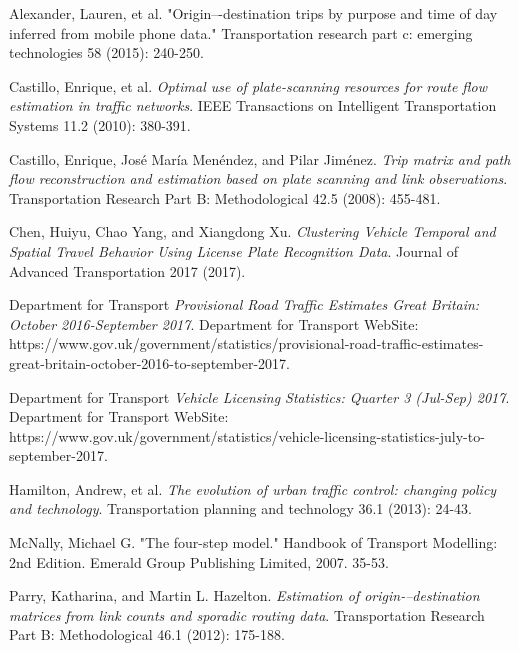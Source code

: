 \documentclass[twoside,leqno,twocolumn]{article}
\begin{document}










\begin{thebibliography}{99}

Alexander, Lauren, et al. "Origin–-destination trips by purpose and time of day inferred from mobile phone data." Transportation research part c: emerging technologies 58 (2015): 240-250.

Castillo, Enrique, et al. {\em Optimal use of plate-scanning resources for route flow estimation in traffic networks}. IEEE Transactions on Intelligent Transportation Systems 11.2 (2010): 380-391.

Castillo, Enrique, José María Menéndez, and Pilar Jiménez. {\em Trip matrix and path flow reconstruction and estimation based on plate scanning and link observations}. Transportation Research Part B: Methodological 42.5 (2008): 455-481.

Chen, Huiyu, Chao Yang, and Xiangdong Xu. {\em Clustering Vehicle Temporal and Spatial Travel Behavior Using License Plate Recognition Data}. Journal of Advanced Transportation 2017 (2017).

Department for Transport {\em Provisional Road Traffic Estimates Great Britain: October 2016-September 2017}. Department for Transport WebSite: https://www.gov.uk/government/statistics/provisional-road-traffic-estimates-great-britain-october-2016-to-september-2017.

Department for Transport {\em Vehicle Licensing Statistics: Quarter 3 (Jul-Sep) 2017}. Department for Transport WebSite: https://www.gov.uk/government/statistics/vehicle-licensing-statistics-july-to-september-2017.

Hamilton, Andrew, et al. {\em The evolution of urban traffic control: changing policy and technology}. Transportation planning and technology 36.1 (2013): 24-43.

McNally, Michael G. "The four-step model." Handbook of Transport Modelling: 2nd Edition. Emerald Group Publishing Limited, 2007. 35-53.

Parry, Katharina, and Martin L. Hazelton. {\em Estimation of origin-–destination matrices from link counts and sporadic routing data}. Transportation Research Part B: Methodological 46.1 (2012): 175-188.


\end{thebibliography}
\end{document}
